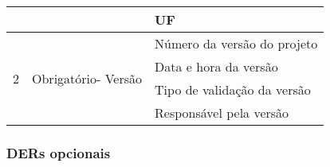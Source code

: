 \begin{table}[!h]
\begin{tabular}{|c|c|l|}
			      &   & UF                                                  \\ \hline   
	  \multirow{4}{*}{2}        & \multirow{4}{*}{Obrigatório- Versão} & Número da versão do projeto \\ \cline{3-3} 
				      &                              & Data e hora da versão       \\ \cline{3-3} 
				      &                              & Tipo de validação da versão \\ \cline{3-3} 
				      &                              & Responsável pela versão     \\ \hline
	  \end{tabular}
	  \end{table}
      
      \vfill
      \pagebreak
      \subsubsection*{DERs opcionais}
      

